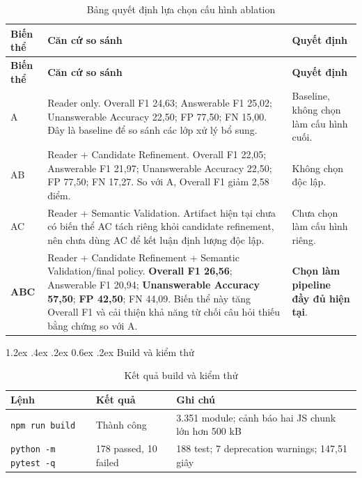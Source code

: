 \documentclass[12pt,a4paper,oneside]{report}
\makeatletter
\renewcommand\section{\@startsection {section}{1}{\z@}%
  {1.2ex \@plus .4ex \@minus .2ex}%
  {0.6ex \@plus .2ex}%
  {\normalfont\Large\bfseries}}
\newcommand{\code}[1]{\texttt{#1}}
\makeatother
\begin{document}
\begin{longtable}{L{3.0cm}L{7.2cm}L{4.0cm}}
\caption{Bảng quyết định lựa chọn cấu hình ablation}\label{tab:ablation-selection}\\
\toprule
\textbf{Biến thể} & \textbf{Căn cứ so sánh} & \textbf{Quyết định} \\
\midrule
\endfirsthead
\toprule
\textbf{Biến thể} & \textbf{Căn cứ so sánh} & \textbf{Quyết định} \\
\midrule
\endhead
A & Reader only. Overall F1 24,63; Answerable F1 25,02; Unanswerable Accuracy 22,50; FP 77,50; FN 15,00. Đây là baseline để so sánh các lớp xử lý bổ sung. & Baseline, không chọn làm cấu hình cuối. \\
AB & Reader + Candidate Refinement. Overall F1 22,05; Answerable F1 21,97; Unanswerable Accuracy 22,50; FP 77,50; FN 17,27. So với A, Overall F1 giảm 2,58 điểm. & Không chọn độc lập. \\
AC & Reader + Semantic Validation. Artifact hiện tại chưa có biến thể AC tách riêng khỏi candidate refinement, nên chưa dùng AC để kết luận định lượng độc lập. & Chưa chọn làm cấu hình riêng. \\
\textbf{ABC} & Reader + Candidate Refinement + Semantic Validation/final policy. \textbf{Overall F1 26,56}; Answerable F1 20,94; \textbf{Unanswerable Accuracy 57,50}; \textbf{FP 42,50}; FN 44,09. Biến thể này tăng Overall F1 và cải thiện khả năng từ chối câu hỏi thiếu bằng chứng so với A. & \textbf{Chọn làm pipeline đầy đủ hiện tại}. \\
\bottomrule
\end{longtable}

\section{Build và kiểm thử}
\begin{table}[H]
\centering
\caption{Kết quả build và kiểm thử}
\label{tab:tests}
\begin{tabularx}{\textwidth}{L{3.5cm}L{3.2cm}Y}
\toprule
Lệnh & Kết quả & Ghi chú \\
\midrule
\code{npm run build} & Thành công & 3.351 module; cảnh báo hai JS chunk lớn hơn 500 kB \\
\code{python -m pytest -q} & 178 passed, 10 failed & 188 test; 7 deprecation warnings; 147,51 giây \\
\bottomrule
\end{tabularx}
\end{table}
\end{document}
